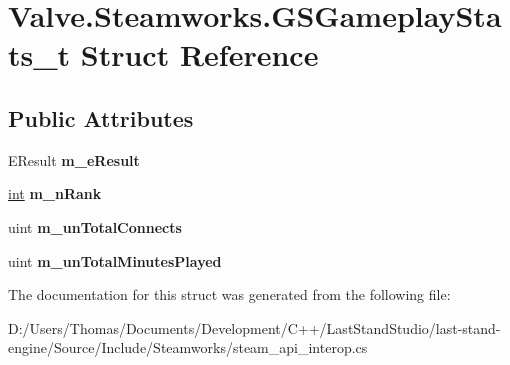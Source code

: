 \hypertarget{structValve_1_1Steamworks_1_1GSGameplayStats__t}{}\section{Valve.\+Steamworks.\+G\+S\+Gameplay\+Stats\+\_\+t Struct Reference}
\label{structValve_1_1Steamworks_1_1GSGameplayStats__t}
\subsection*{Public Attributes}
\begin{DoxyCompactItemize}
\item 
\hypertarget{structValve_1_1Steamworks_1_1GSGameplayStats__t_ab240284927b93c9d79427f3ffd70f738}{}E\+Result {\bfseries m\+\_\+e\+Result}\label{structValve_1_1Steamworks_1_1GSGameplayStats__t_ab240284927b93c9d79427f3ffd70f738}

\item 
\hypertarget{structValve_1_1Steamworks_1_1GSGameplayStats__t_ae483bac75de7a01372ed95b850746a79}{}\hyperlink{SDL__thread_8h_a6a64f9be4433e4de6e2f2f548cf3c08e}{int} {\bfseries m\+\_\+n\+Rank}\label{structValve_1_1Steamworks_1_1GSGameplayStats__t_ae483bac75de7a01372ed95b850746a79}

\item 
\hypertarget{structValve_1_1Steamworks_1_1GSGameplayStats__t_a9c00fc431bcee90805821c066c4a52dd}{}uint {\bfseries m\+\_\+un\+Total\+Connects}\label{structValve_1_1Steamworks_1_1GSGameplayStats__t_a9c00fc431bcee90805821c066c4a52dd}

\item 
\hypertarget{structValve_1_1Steamworks_1_1GSGameplayStats__t_a10eee0f3ff57e09b0dc294b9fb66aeac}{}uint {\bfseries m\+\_\+un\+Total\+Minutes\+Played}\label{structValve_1_1Steamworks_1_1GSGameplayStats__t_a10eee0f3ff57e09b0dc294b9fb66aeac}

\end{DoxyCompactItemize}


The documentation for this struct was generated from the following file\+:\begin{DoxyCompactItemize}
\item 
D\+:/\+Users/\+Thomas/\+Documents/\+Development/\+C++/\+Last\+Stand\+Studio/last-\/stand-\/engine/\+Source/\+Include/\+Steamworks/steam\+\_\+api\+\_\+interop.\+cs\end{DoxyCompactItemize}

